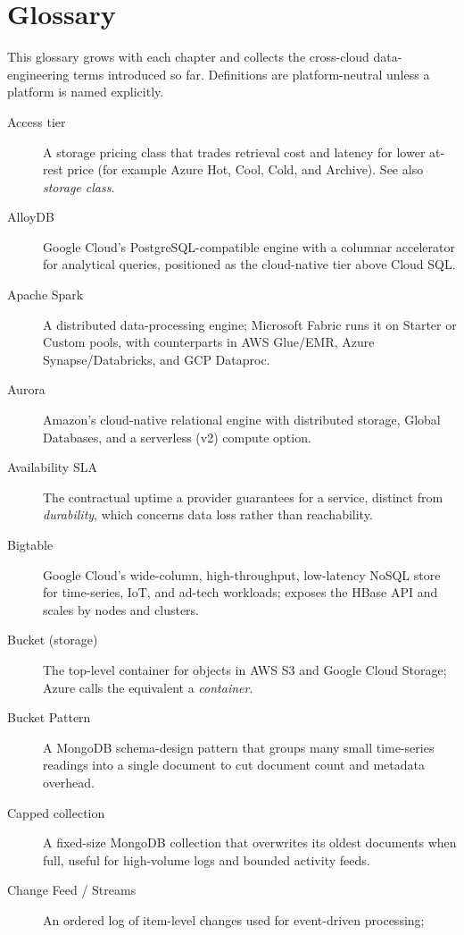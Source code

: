 \chapter*{Glossary}
%

This glossary grows with each chapter and collects the cross-cloud data-engineering terms
introduced so far. Definitions are platform-neutral unless a platform is named explicitly.

\begin{description}
  \item[Access tier] A storage pricing class that trades retrieval cost and latency for lower
    at-rest price (for example Azure Hot, Cool, Cold, and Archive). See also \emph{storage class}.
  \item[AlloyDB] Google Cloud's PostgreSQL-compatible engine with a columnar accelerator for
    analytical queries, positioned as the cloud-native tier above Cloud SQL.
  \item[Apache Spark] A distributed data-processing engine; Microsoft Fabric runs it on Starter or
    Custom pools, with counterparts in AWS Glue/EMR, Azure Synapse/Databricks, and GCP Dataproc.
  \item[Aurora] Amazon's cloud-native relational engine with distributed storage, Global Databases,
    and a serverless (v2) compute option.
  \item[Availability SLA] The contractual uptime a provider guarantees for a service, distinct from
    \emph{durability}, which concerns data loss rather than reachability.
  \item[Bigtable] Google Cloud's wide-column, high-throughput, low-latency NoSQL store for
    time-series, IoT, and ad-tech workloads; exposes the HBase API and scales by nodes and clusters.
  \item[Bucket (storage)] The top-level container for objects in AWS S3 and Google Cloud Storage;
    Azure calls the equivalent a \emph{container}.
  \item[Bucket Pattern] A MongoDB schema-design pattern that groups many small time-series readings
    into a single document to cut document count and metadata overhead.
  \item[Capped collection] A fixed-size MongoDB collection that overwrites its oldest documents when
    full, useful for high-volume logs and bounded activity feeds.
  \item[Change Feed / Streams] An ordered log of item-level changes used for event-driven processing;

\end{description}

